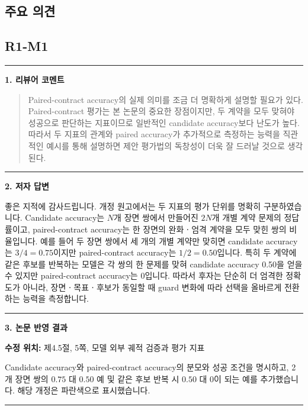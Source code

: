\documentclass[11pt]{article}
\newcommand{\fieldheading}[2]{%
  \par\medskip\noindent
  {\color{#1}\rule{3pt}{1.25em}}\hspace{0.55em}\textbf{#2}\par\smallskip}
\newenvironment{reviewitem}[1]
  {\subsection*{#1}}
  {\par\medskip\hrule\bigskip}
\newenvironment{reviewercomment}
  {\fieldheading{reviewercolor}{1. 리뷰어 코멘트}%
   \begin{quote}}
  {\end{quote}}
\newenvironment{authorresponse}
  {\fieldheading{responsecolor}{2. 저자 답변}}
  {\par}
\newenvironment{manuscriptrevision}[1]
  {\fieldheading{revisioncolor}{3. 논문 반영 결과}%
   \textbf{수정 위치:} #1\par\smallskip}
  {\par}
\begin{document}
\subsection*{주요 의견}

\begin{reviewitem}{R1-M1}
  \begin{reviewercomment}
    Paired-contract accuracy의 실제 의미를 조금 더 명확하게 설명할 필요가 있다.
    Paired-contract 평가는 본 논문의 중요한 장점이지만, 두 계약을 모두 맞혀야
    성공으로 판단하는 지표이므로 일반적인 candidate accuracy보다 난도가 높다.
    따라서 두 지표의 관계와 paired accuracy가 추가적으로 측정하는 능력을
    직관적인 예시를 통해 설명하면 제안 평가법의 독창성이 더욱 잘 드러날 것으로
    생각된다.
  \end{reviewercomment}

  \begin{authorresponse}
    좋은 지적에 감사드립니다. 개정 원고에서는 두 지표의 평가 단위를 명확히
    구분하였습니다. Candidate accuracy는 $N$개 장면 쌍에서 만들어진 $2N$개 개별
    계약 문제의 정답률이고, paired-contract accuracy는 한 장면의 완화ㆍ엄격
    계약을 모두 맞힌 쌍의 비율입니다. 예를 들어 두 장면 쌍에서 세 개의 개별
    계약만 맞히면 candidate accuracy는 $3/4=0.75$이지만 paired-contract
    accuracy는 $1/2=0.50$입니다. 특히 두 계약에 같은 후보를 반복하는 모델은 각
    쌍의 한 문제를 맞혀 candidate accuracy 0.50을 얻을 수 있지만
    paired-contract accuracy는 0입니다. 따라서 후자는 단순히 더 엄격한 정확도가
    아니라, 장면ㆍ목표ㆍ후보가 동일할 때 guard 변화에 따라 선택을 올바르게
    전환하는 능력을 측정합니다.
  \end{authorresponse}

  \begin{manuscriptrevision}{제4.5절, 5쪽, 모델 외부 궤적 검증과 평가 지표}
    Candidate accuracy와 paired-contract accuracy의 분모와 성공 조건을
    명시하고, 2개 장면 쌍의 $0.75$ 대 $0.50$ 예 및 같은 후보 반복 시 $0.50$ 대
    $0$이 되는 예를 추가했습니다. 해당 개정은 파란색으로 표시했습니다.
  \end{manuscriptrevision}
\end{reviewitem}
\end{document}
